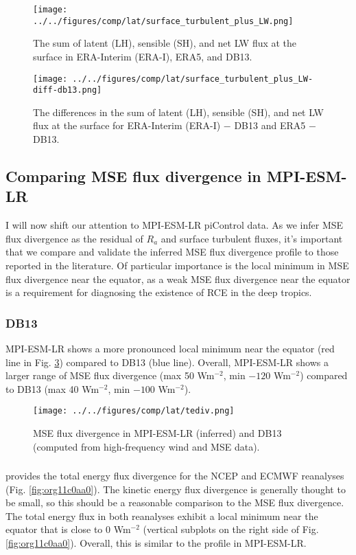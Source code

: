 \documentclass[11pt]{article}
\begin{document}
\begin{figure}[htbp]
\centering
\texttt{[image: ../../figures/comp/lat/surface\_turbulent\_plus\_LW.png]}
\caption{\label{fig:org8e4c2fb}The sum of latent (LH), sensible (SH), and net LW flux at the surface in ERA-Interim (ERA-I), ERA5, and DB13.}
\end{figure}

\begin{figure}[htbp]
\centering
\texttt{[image: ../../figures/comp/lat/surface\_turbulent\_plus\_LW-diff-db13.png]}
\caption{\label{fig:org6160dfc}The differences in the sum of latent (LH), sensible (SH), and net LW flux at the surface for ERA-Interim (ERA-I) \(-\) DB13 and ERA5 \(-\) DB13.}
\end{figure}

\subsection{Comparing MSE flux divergence in MPI-ESM-LR}
\label{sec:org2f978e1}
I will now shift our attention to MPI-ESM-LR piControl data. As we infer MSE flux divergence as the residual of \(R_a\) and surface turbulent fluxes, it's important that we compare and validate the inferred MSE flux divergence profile to those reported in the literature. Of particular importance is the local minimum in MSE flux divergence near the equator, as a weak MSE flux divergence near the equator is a requirement for diagnosing the existence of RCE in the deep tropics.
\subsubsection{DB13}
\label{sec:org32e6e8d}
MPI-ESM-LR shows a more pronounced local minimum near the equator (red line in Fig. \ref{fig:orgf8082a4}) compared to DB13 (blue line). Overall, MPI-ESM-LR shows a larger range of MSE flux divergence (max 50 Wm\(^{-2}\), min \(-120\) Wm\(^{-2}\)) compared to DB13 (max 40 Wm\(^{-2}\), min \(-100\) Wm\(^{-2}\)).

\begin{figure}[htbp]
\centering
\texttt{[image: ../../figures/comp/lat/tediv.png]}
\caption{\label{fig:orgf8082a4}MSE flux divergence in MPI-ESM-LR (inferred) and DB13 (computed from high-frequency wind and MSE data).}
\end{figure}

\subsubsection{\cite{trenberth_atmospheric_2001}}
\label{sec:org3906601}
\cite{trenberth_atmospheric_2001} provides the total energy flux divergence for the NCEP and ECMWF reanalyses (Fig. \ref{fig:org11c0aa0}). The kinetic energy flux divergence is generally thought to be small, so this should be a reasonable comparison to the MSE flux divergence. The total energy flux in both reanalyses exhibit a local minimum near the equator that is close to 0 Wm\(^{-2}\) (vertical subplots on the right side of Fig. \ref{fig:org11c0aa0}). Overall, this is similar to the profile in MPI-ESM-LR.
\end{document}
